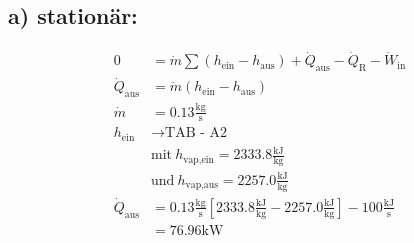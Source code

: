 \subsection*{a) stationär:}

\begin{align*}
0 &= \dot{m} \sum (h_{\text{ein}} - h_{\text{aus}}) + \dot{Q}_{\text{aus}} - \dot{Q}_{\text{R}} - \dot{W}_{\text{in}} \\
\dot{Q}_{\text{aus}} &= \dot{m} (h_{\text{ein}} - h_{\text{aus}}) \\
\dot{m} &= 0.13 \frac{\text{kg}}{\text{s}} \\
h_{\text{ein}} &\rightarrow \text{TAB - A2} \\
&\text{mit} \ h_{\text{vap,ein}} = 2333.8 \frac{\text{kJ}}{\text{kg}} \\
&\text{und} \ h_{\text{vap,aus}} = 2257.0 \frac{\text{kJ}}{\text{kg}} \\
\dot{Q}_{\text{aus}} &= 0.13 \frac{\text{kg}}{\text{s}} \left[ 2333.8 \frac{\text{kJ}}{\text{kg}} - 2257.0 \frac{\text{kJ}}{\text{kg}} \right] - 100 \frac{\text{kJ}}{\text{s}} \\
&= 76.96 \text{kW}
\end{align*}